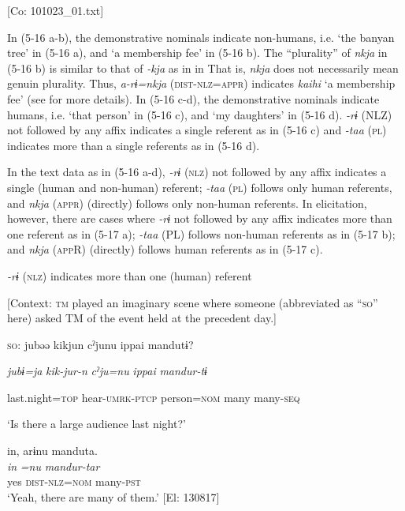     [Co: 101023\_01.txt]
    \z
\z

\noindent In (5-16 a-b), the demonstrative nominals indicate non-humans, i.e. ‘the banyan tree’ in (5-16 a), and ‘a membership fee’ in (5-16 b). The “plurality” of \textit{nkja} in (5-16 b) is similar to that of \textit{{}-kja} as in  in  That is, \textit{nkja} does not necessarily mean genuin plurality. Thus, \textit{a-rɨ=nkja} (\textsc{dist}-\textsc{nlz}=\textsc{appr}) indicates \textit{kaihi} ‘a membership fee’ (see  for more details). In (5-16 c-d), the demonstrative nominals indicate humans, i.e. ‘that person’ in (5-16 c), and ‘my daughters’ in (5-16 d). \textit{{}-rɨ} (NLZ) not followed by any affix indicates a single referent as in (5-16 c) and \textit{{}-taa} (\textsc{pl}) indicates more than a single referents as in (5-16 d).

  In the text data as in (5-16 a-d), \textit{{}-rɨ} (\textsc{nlz}) not followed by any affix indicates a single (human and non-human) referent; \textit{{}-taa} (\textsc{pl}) follows only human referents, and \textit{nkja} (\textsc{appr}) (directly) follows only non-human referents. In elicitation, however, there are cases where \textit{{}-rɨ} not followed by any affix indicates more than one referent as in (5-17 a); \textit{{}-taa} (PL) follows non-human referents as in (5-17 b); and \textit{nkja} (\textsc{app}R) (directly) follows human referents as in (5-17 c).

\ea \label{ex:5:17}  \ea \label{ex:5:17a} \textit{{}-rɨ} (\textsc{nlz}) indicates more than one (human) referent

    [Context: \textsc{tm} played an imaginary scene where someone (abbreviated as “\textsc{so}” here) asked TM of the event held at the precedent day.]

    \textsc{so}:  jubəə  kikjun  cˀjunu  ippai  mandutɨ?

      \textit{jubɨ=ja}  \textit{kik-jur-n}  \textit{cˀju=nu}  \textit{ippai}  \textit{mandur-tɨ}

      last.night=\textsc{top}  hear-\textsc{umrk}-\textsc{ptcp}  person=\textsc{nom}  many  many-\textsc{seq}

      ‘Is there a large audience last night?’

\glll  in,  arɨnu  manduta.\\
\textit{in}  \textit{=nu}  \textit{mandur-tar}\\
yes  \textsc{dist}-\textsc{nlz}=\textsc{nom}  many-\textsc{pst}\\
\glt ‘Yeah, there are many of them.’ [El: 130817]

